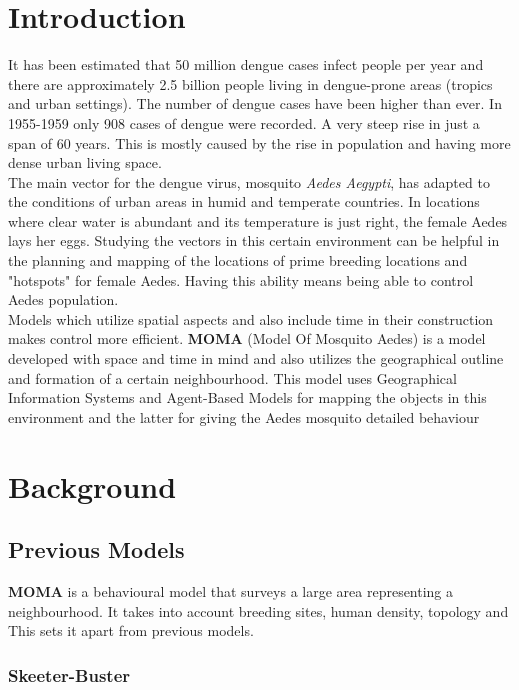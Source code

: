 \section{Introduction}

It has been estimated that 50 million dengue cases infect people per year and there are approximately 2.5 billion people living in dengue-prone areas (tropics and urban settings). The number of dengue cases have been higher than ever. In 1955-1959 only 908 cases of dengue were recorded. A very steep rise in just a span of 60 years. This is mostly caused by the rise in population and having more dense urban living space.\\

The main vector for the dengue virus, mosquito \textit{Aedes Aegypti}, has adapted to the conditions of urban areas in humid and temperate countries. In locations where clear water is abundant and its temperature is just right, the female Aedes lays her eggs. Studying the vectors in this certain environment can be helpful in the planning and mapping of the locations of prime breeding locations and "hotspots" for female Aedes. Having this ability means being able to control Aedes population.\\

Models which utilize spatial aspects and also include time in their construction makes control more efficient. \textbf{MOMA} (Model Of Mosquito Aedes) is a model developed with space and time in mind and also utilizes the geographical outline and formation of a certain neighbourhood. This model uses Geographical Information Systems and Agent-Based Models for mapping the objects in this environment and the latter for giving the Aedes mosquito detailed behaviour

\section{Background}



\subsection{Previous Models}

\textbf{MOMA} is a behavioural model that surveys a large area representing a neighbourhood. It takes into account breeding sites, human density, topology and This sets it apart from previous models.

\subsubsection{Skeeter-Buster} 

